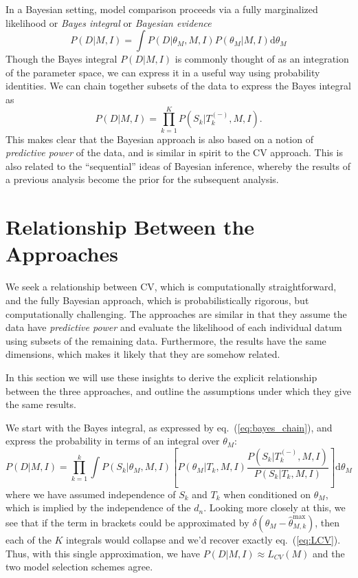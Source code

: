 \documentclass[12pt]{article}
\newcommand{\dd}{\mathrm{d}}
\newcommand{\thetamax}[1]{\ensuremath{\hat{\theta}^{\max}_{#1}}}
\newcommand{\LCV}[1]{\ensuremath{L_{CV}}(#1)}
\newcommand{\Tkminus}{\ensuremath{T_k^{(-)}}}
\newcommand{\eqn}[1]{eq.~(\ref{eq:#1})}
\begin{document}
In a Bayesian setting, model comparison proceeds via a fully marginalized
likelihood or {\it Bayes integral} or {\it Bayesian evidence}
\begin{equation}
  P(D|M,I) = \int P(D|\theta_M,M,I) P(\theta_M|M,I)\dd\theta_M
\end{equation}
Though the Bayes integral $P(D|M,I)$ is commonly thought of as an
integration of the parameter space, we can express it in a useful way
using probability identities.  We can chain together subsets of the
data to express the Bayes integral as
\begin{equation}
  \label{eq:bayes_chain}
  P(D|M,I) = \prod_{k=1}^K P(S_k|\Tkminus,M,I).
\end{equation}
This makes clear that the Bayesian approach is also based on a notion of
{\it predictive power} of the data, and is similar in spirit to
the CV approach.  This is also related to the ``sequential'' ideas
of Bayesian inference, whereby the results of a previous analysis become
the prior for the subsequent analysis.

\section{Relationship Between the Approaches}
We seek a relationship between CV, which is computationally straightforward,
and the fully Bayesian approach, which is probabilistically rigorous, but
computationally challenging.  The approaches are similar in that they assume
the data have {\it predictive power} and evaluate the likelihood of each
individual datum using subsets of the remaining data.  Furthermore, the
results have the same dimensions, which makes it likely that they are
somehow related.

In this section we will use these insights to derive the explicit
relationship between the three approaches, and outline the assumptions
under which they give the same results.

We start with the Bayes integral, as expressed by \eqn{bayes_chain},
and express the probability in terms of an integral over $\theta_M$:
\begin{equation}
  P(D|M, I) = \prod_{k=1}^k
  \int P(S_k|\theta_M,M,I) 
  \left[P(\theta_M|T_k,M,I)\frac{P(S_k|\Tkminus,M,I)}
    {P(S_k|T_k,M,I)}
  \right]\dd\theta_M
\end{equation}
where we have assumed independence of $S_k$ and $T_k$ when conditioned
on $\theta_M$, which is implied by the independence of the  $d_n$.
Looking more closely at this, we see that if the term in brackets
could be approximated by $\delta(\theta_M - \thetamax{M,k})$, then
each of the $K$ integrals would collapse and we'd recover exactly \eqn{LCV}.
Thus, with this single approximation, we have $P(D|M, I) \approx \LCV{M}$
and the two model selection schemes agree.
\end{document}
